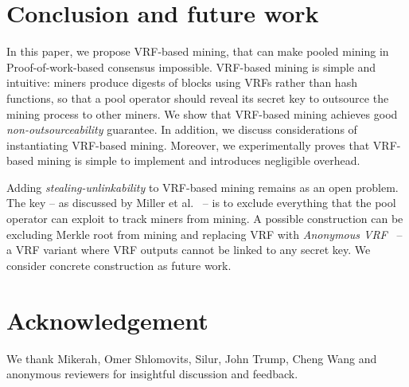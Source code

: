 \section{Conclusion and future work}
\label{sec:conclusion}

In this paper, we propose VRF-based mining, that can make pooled mining in Proof-of-work-based consensus impossible.
VRF-based mining is simple and intuitive: miners produce digests of blocks using VRFs rather than hash functions, so that a pool operator should reveal its secret key to outsource the mining process to other miners.
We show that VRF-based mining achieves good \emph{non-outsourceability} guarantee.
In addition, we discuss considerations of instantiating VRF-based mining.
Moreover, we experimentally proves that VRF-based mining is simple to implement and introduces negligible overhead.

Adding \emph{stealing-unlinkability} to VRF-based mining remains as an open problem.
The key -- as discussed by Miller et al.~\cite{miller2015nonoutsourceable} -- is to exclude everything that the pool operator can exploit to track miners from mining.
A possible construction can be excluding Merkle root from mining and replacing VRF with \emph{Anonymous VRF}~\cite{ganesh2019proof} -- a VRF variant where VRF outputs cannot be linked to any secret key.
We consider concrete construction as future work.

\section*{Acknowledgement}
We thank Mikerah, Omer Shlomovits, Silur, John Trump, Cheng Wang and anonymous reviewers for insightful discussion and feedback.